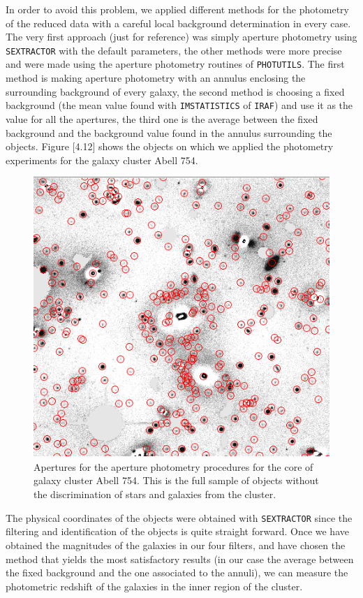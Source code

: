 In order to avoid this problem, we applied different methods for the photometry of the reduced data with a careful local background determination in every case. The very first approach (just for reference) was simply aperture photometry using \texttt{SEXTRACTOR} with the default parameters, the other methods were more precise and were made using the aperture photometry routines of \texttt{PHOTUTILS}. The first method is making aperture photometry with an annulus enclosing the surrounding background of every galaxy, the second method is choosing a fixed background (the mean value found with \texttt{IMSTATISTICS} of \texttt{IRAF}) and use it as the value for all the apertures, the third one is the average between the fixed background and the background value found in the annulus surrounding the objects. Figure [4.12] shows the objects on which we applied the photometry experiments for the galaxy cluster Abell 754.

\begin{figure}[H]
\centering
\includegraphics[width=12cm]{images/aperture_photometry.png}
\caption[Apertures for the aperture photometry procedures on Abell 754]{Apertures for the aperture photometry procedures for the core of galaxy cluster Abell 754. This is the full sample of objects without the discrimination of stars and galaxies from the cluster.}
\end{figure}

The physical coordinates of the objects  were obtained with \texttt{SEXTRACTOR} since the filtering and identification of the objects is quite straight forward. Once we have obtained the magnitudes of the galaxies in our four filters, and have chosen the method that yields the most satisfactory results (in our case the average between the fixed background and the one associated to the annuli), we can measure the photometric redshift of the galaxies in the inner region of the cluster.

